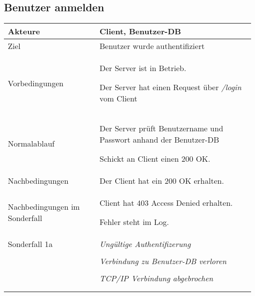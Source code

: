 \documentclass[a4paper,10pt,titlepage,parskip=true]{article}
\makeatletter
\newcommand\novspace{\@minipagetrue}
\newenvironment{owncompactitem}{%
\compactitem
}{%
\@finalstrut\@arstrutbox
\@nameuse{endcompactitem}%
\aftergroup\let\aftergroup\@finalstrut\aftergroup\@gobble
}
\newenvironment{owncompactenum}{%
\compactenum
}{%
\@finalstrut\@arstrutbox
\@nameuse{endcompactenum}%
\aftergroup\let\aftergroup\@finalstrut\aftergroup\@gobble
}
\newcommand{\usecase}[7]
{\subsection{#1}
\setlength{\extrarowheight}{2pt}
\begin{tabular}{|p{0.2\textwidth}|p{0.9\textwidth}|}
\hline
  Akteure & #2\\\hline
  Ziel & #3\\\hline
  Vorbedingungen & \novspace
  	\begin{owncompactitem}[-] #4 \end{owncompactitem} \\\hline
  Normalablauf & \vspace{-7pt}
  	\begin{owncompactenum}[1.] #6 \end{owncompactenum} \\\hline
  Nachbedingungen & \novspace
  	\begin{owncompactitem}[-] #5 \end{owncompactitem} \\\hline
  #7
\end{tabular}
}
\newcommand{\sonderfall}[4][\empty]
{
Sonderfall #2 & \vspace{-10pt}
	\textit{#3}
	\begin{owncompactenum}[{#2}.1] {#4} \end{owncompactenum}
  	\ifthenelse{\equal{#1}{\empty}}
    	{\\\hline} %
    	{\ensuremath{\rightarrow} #1 \\ [+1pt] \hline} %

}
\newcommand{\sondernachbedingung}[1]
{
Nachbedingungen im Sonderfall& \novspace
	\begin{owncompactitem}[-]
		#1
	\end{owncompactitem} \\\hline
}
\makeatother
\begin{document}
\usecase{Benutzer anmelden}{Client, Benutzer-DB}%
{Benutzer wurde authentifiziert}%
{%
  \item Der Server ist in Betrieb.
  \item Der Server hat einen Request über \textit{/login} vom Client
}
{%
  \item Der Client hat ein 200 OK erhalten.
}
{%
  \item Der Server prüft Benutzername und Passwort anhand der Benutzer-DB
  \item Schickt an Client einen 200 OK.
}
{%
  \sondernachbedingung{
	\item Client hat 403 Access Denied erhalten.
	\item Fehler steht im Log.
	}
	\sonderfall[Weiter mit normalem Betrieb]{1a}
    {Ungültige Authentifizerung}
    {
    \item Fehler wird ins Log geschrieben
  	\item Der Client erhält eine entsprechende Fehlermeldung mit HTTP-Status 403 Access Denied
    }
	
  
	\sonderfall[Kritischer Fehler, Server ist beendet]{*}%
	{Verbindung zu Benutzer-DB verloren}%
  	{
	\item Der Fehler wird ins Log geschrieben (als schwerwiegender Fehler)
	\item Der Client erhält eine entsprechende Fehlermeldung
	\item Der Server wird beendet
  	}

\sonderfall[Weiter mit normalem Betrieb]{**}%
	{TCP/IP Verbindung abgebrochen}%
	{
	\item Fehlermeldung wird ins Log geschrieben
	}
}
\end{document}
